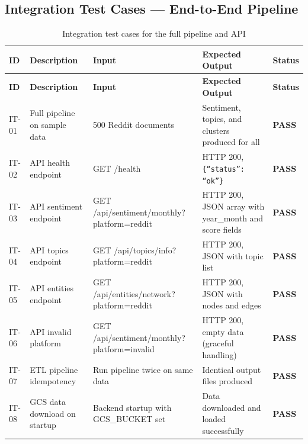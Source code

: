 \documentclass[12pt, letterpaper]{article}
\begin{document}
\subsection{Integration Test Cases --- End-to-End Pipeline}

\begin{longtable}{p{1cm} p{3.8cm} p{3.2cm} p{3.2cm} p{1.5cm}}
  \caption{Integration test cases for the full pipeline and API}
  \label{tab:integration_tests} \\
  \toprule
  \textbf{ID} & \textbf{Description} & \textbf{Input} & \textbf{Expected Output} & \textbf{Status} \\
  \midrule
  \endfirsthead
  \toprule
  \textbf{ID} & \textbf{Description} & \textbf{Input} & \textbf{Expected Output} & \textbf{Status} \\
  \midrule
  \endhead
  \bottomrule
  \endlastfoot
  IT-01 & Full pipeline on sample data    & 500 Reddit documents        & Sentiment, topics, and clusters produced for all & \textcolor{commentgreen}{\textbf{PASS}} \\[4pt]
  IT-02 & API health endpoint              & GET /health                 & HTTP 200, \texttt{\{``status'': ``ok''\}} & \textcolor{commentgreen}{\textbf{PASS}} \\[4pt]
  IT-03 & API sentiment endpoint           & GET /api/sentiment/monthly?platform=reddit & HTTP 200, JSON array with year\_month and score fields & \textcolor{commentgreen}{\textbf{PASS}} \\[4pt]
  IT-04 & API topics endpoint              & GET /api/topics/info?platform=reddit & HTTP 200, JSON with topic list & \textcolor{commentgreen}{\textbf{PASS}} \\[4pt]
  IT-05 & API entities endpoint            & GET /api/entities/network?platform=reddit & HTTP 200, JSON with nodes and edges & \textcolor{commentgreen}{\textbf{PASS}} \\[4pt]
  IT-06 & API invalid platform             & GET /api/sentiment/monthly?platform=invalid & HTTP 200, empty data (graceful handling) & \textcolor{commentgreen}{\textbf{PASS}} \\[4pt]
  IT-07 & ETL pipeline idempotency         & Run pipeline twice on same data & Identical output files produced & \textcolor{commentgreen}{\textbf{PASS}} \\[4pt]
  IT-08 & GCS data download on startup     & Backend startup with GCS\_BUCKET set & Data downloaded and loaded successfully & \textcolor{commentgreen}{\textbf{PASS}} \\
\end{longtable}
\end{document}
